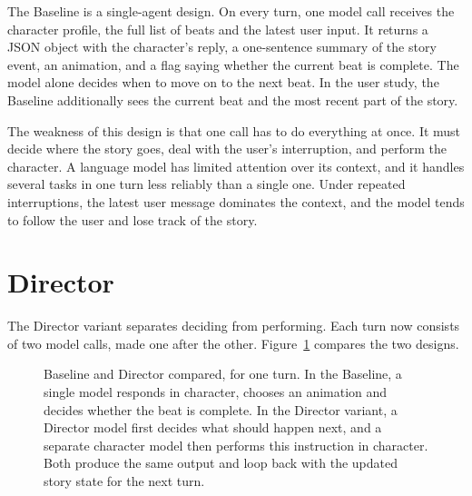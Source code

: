 The Baseline is a single-agent design. On every turn, one model call receives the character profile, the full list of beats and the latest user input. It returns a JSON object with the character's reply, a one-sentence summary of the story event, an animation, and a flag saying whether the current beat is complete. The model alone decides when to move on to the next beat. In the user study, the Baseline additionally sees the current beat and the most recent part of the story.

The weakness of this design is that one call has to do everything at once. It must decide where the story goes, deal with the user's interruption, and perform the character. A language model has limited attention over its context, and it handles several tasks in one turn less reliably than a single one. Under repeated interruptions, the latest user message dominates the context, and the model tends to follow the user and lose track of the story.

\section{Director}\label{sec:director}

The Director variant separates deciding from performing. Each turn now consists of two model calls, made one after the other. Figure~\ref{fig:architecture} compares the two designs.

\begin{figure}[htbp]
\centering
\resizebox{\linewidth}{!}{}
\caption{Baseline and Director compared, for one turn. In the Baseline, a single model responds in character, chooses an animation and decides whether the beat is complete. In the Director variant, a Director model first decides what should happen next, and a separate character model then performs this instruction in character. Both produce the same output and loop back with the updated story state for the next turn.}
\label{fig:architecture}
\end{figure}

